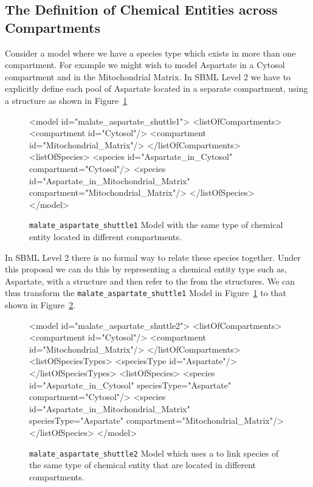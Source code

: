 \documentclass{cekarticle}
\begin{document}
\subsection{The Definition of Chemical Entities across Compartments}
\label{sec:commonspecies}

Consider a model where we have a species type which exists in more than one compartment.
For example we might wish to model Aspartate in a Cytosol compartment and in the Mitochondrial Matrix.
In SBML Level 2 we have to explicitly define each pool of Aspartate located in a separate compartment,
using a  structure as shown in Figure~\ref{fig:malate_aspartate_shuttle1-xml}

\begin{figure}[h]
\begin{example}
<model id="malate_aspartate_shuttle1">
    <listOfCompartments>
        <compartment id="Cytosol"/>
        <compartment id="Mitochondrial_Matrix"/>
    </listOfCompartments>
    <listOfSpecies>
        <species id="Aspartate_in_Cytosol" compartment="Cytosol"/>
        <species id="Aspartate_in_Mitochondrial_Matrix" compartment="Mitochondrial_Matrix"/>
    </listOfSpecies>
</model>
\end{example}
\caption{\texttt{malate\_aspartate\_shuttle1} Model with the same type of chemical entity located in
different compartments.} 
\label{fig:malate_aspartate_shuttle1-xml}
\end{figure}

In SBML Level 2 there is no formal way to relate these species together.  Under this proposal
we can do this by representing a chemical entity type such as, Aspartate,
with a  structure and then
refer to the  from the  structures.  We can thus transform the 
\texttt{malate\_aspartate\_shuttle1} Model in Figure~\ref{fig:malate_aspartate_shuttle1-xml} to that
shown in Figure~\ref{fig:malate_aspartate_shuttle2-xml}.

\begin{figure}[h]
\begin{example}
<model id="malate_aspartate_shuttle2">
    <listOfCompartments>
        <compartment id="Cytosol"/>
        <compartment id="Mitochondrial_Matrix"/>
    </listOfCompartments>
    <listOfSpeciesTypes>
        <speciesType id="Aspartate"/>
    </listOfSpeciesTypes>
    <listOfSpecies>
        <species
            id="Aspartate_in_Cytosol"
            speciesType="Aspartate"
            compartment="Cytosol"/>
        <species
            id="Aspartate_in_Mitochondrial_Matrix"
            speciesType="Aspartate"
            compartment="Mitochondrial_Matrix"/>
    </listOfSpecies>
</model>
\end{example}
\caption{\texttt{malate\_aspartate\_shuttle2} Model which uses a  to link species of
the same type of chemical entity that are located in different compartments.} 
\label{fig:malate_aspartate_shuttle2-xml}
\end{figure}
\end{document}
